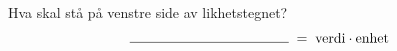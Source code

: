 %
Hva skal stå på venstre side av likhetstegnet?
\[
    \rule{4cm}{0.4pt} \;=\; \textrm{verdi} \cdot \textrm{enhet}
\]
